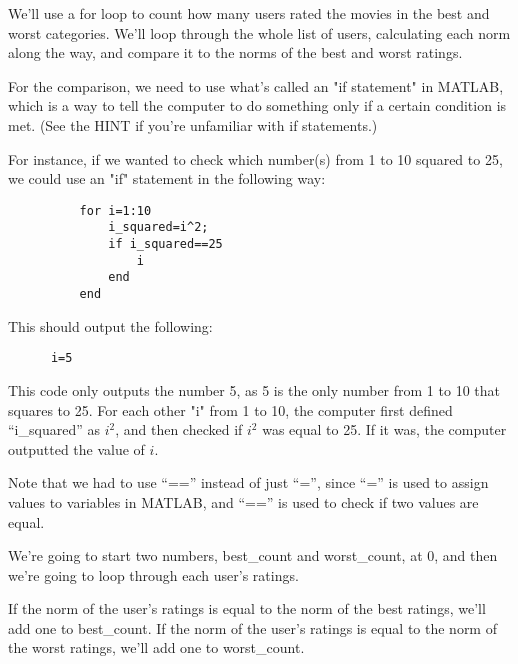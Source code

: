 \documentclass{ximera}
\begin{document}
\begin{exploration}
    We'll use a for loop to count how many users rated the movies in the best and worst categories. We'll loop through the whole list of users, calculating each norm along the way, and compare it to the norms of the best and worst ratings. 
    
    For the comparison, we need to use what's called an "if statement" in MATLAB, which is a way to tell the computer to do something only if a certain condition is met. (See the HINT if you're unfamiliar with if statements.)

    \begin{hint}

      For instance, if we wanted to check which number(s) from 1 to 10 squared to 25, we could use an "if" statement in the following way:
      \begin{verbatim}
          for i=1:10
              i_squared=i^2;
              if i_squared==25
                  i
              end
          end
      \end{verbatim}

   This should output the following:

    \begin{verbatim}
      i=5
    \end{verbatim}

      This code only outputs the number 5, as 5 is the only number from 1 to 10 that squares to 25. For each other "i" from 1 to 10, the computer first defined ``i\_squared'' as $i^2$, and then checked if $i^2$ was equal to 25. If it was, the computer outputted the value of $i$.

      Note that we had to use ``=='' instead of just ``='', since ``='' is used to assign values to variables in MATLAB, and ``=='' is used to check if two values are equal.

    \end{hint}
    
    We're going to start two numbers, best\_count and worst\_count, at 0, and then we're going to loop through each user's ratings. 
    
    If the norm of the user's ratings is equal to the norm of the best ratings, we'll add one to best\_count. If the norm of the user's ratings is equal to the norm of the worst ratings, we'll add one to worst\_count.


\end{exploration}
\end{document}
